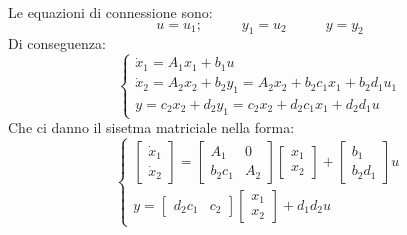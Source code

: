 Le equazioni di connessione sono:
\[
    u = u_1; \;\;\;\;\;\;\;\;\;\;y_1 = u_2 \;\;\;\;\;\;\;\;\;\;y=y_2
\]
Di conseguenza:
\[
    \begin{cases}
        \dot{x}_1 = A_1 x_1 + b_1 u\\
        \dot{x}_2 = A_2 x_2 + b_2 y_1 = A_2 x_2 + b_2 c_1x_1 + b_2 d_1 u_1\\
        y = c_2 x_2 + d_2 y_1 = c_2 x_2 + d_2 c_1 x_1 + d_2 d_1 u
    \end{cases}
\]
Che ci danno il sisetma matriciale nella forma:
\[
    \begin{cases}
        \left[\begin{matrix}
            \dot{x}_1\\\dot{x}_2
        \end{matrix}\right] = \left[\begin{matrix}
            A_1 & 0 \\ b_2 c_1 & A_2
        \end{matrix}\right] \left[\begin{matrix}
            x_1\\x_2
        \end{matrix}\right] + \left[\begin{matrix}
            b_1 \\b_2 d_1
        \end{matrix}\right] u\\
        y = \left[\begin{matrix}
            d_2c_1 & c_2
        \end{matrix}\right] \left[\begin{matrix}
            x_1\\x_2
        \end{matrix}\right] + d_1d_2 u
    \end{cases}
\]
